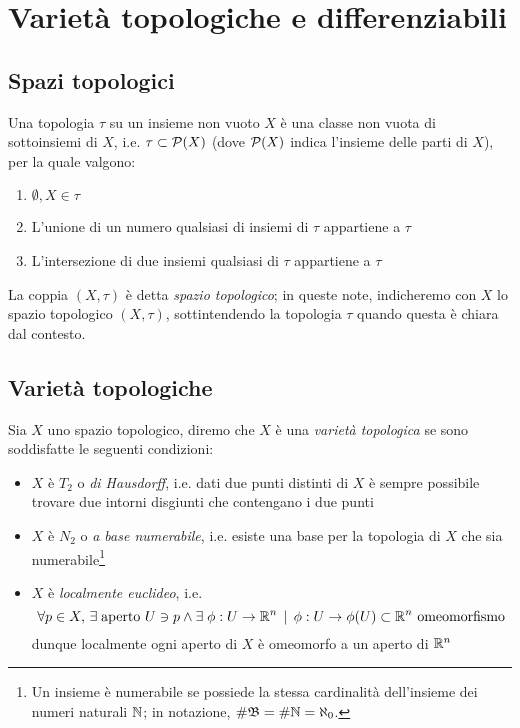 \section{Varietà topologiche e differenziabili}

\subsection{Spazi topologici}

Una topologia $ \tau $ su un insieme non vuoto $ X $ è una classe non vuota di sottoinsiemi di $ X $, i.e. $ \tau \subset \mathcal{P} (X) $ (dove $ \mathcal{P} (X) $ indica l'insieme delle parti di $ X $), per la quale valgono:

\begin{enumerate}
	\item $ \emptyset, X \in \tau $
	
	\item L'unione di un numero qualsiasi di insiemi di $ \tau $ appartiene a $ \tau $
	
	\item L'intersezione di due insiemi qualsiasi di $ \tau $ appartiene a $ \tau $
\end{enumerate}

La coppia $ (X, \tau) $ è detta \textit{spazio topologico}; in queste note, indicheremo con $ X $ lo spazio topologico $ (X, \tau) $, sottintendendo la topologia $ \tau $ quando questa è chiara dal contesto.

\subsection{Varietà topologiche}

Sia $ X $ uno spazio topologico, diremo che $ X $ è una \textit{varietà topologica} se sono soddisfatte le seguenti condizioni:

\begin{itemize}
	\item $ X $ è $ T_{2} $ o \textit{di Hausdorff}, i.e. dati due punti distinti di $ X $ è sempre possibile trovare due intorni disgiunti che contengano i due punti
	
	\item $ X $ è $ N_{2} $ o \textit{a base numerabile}, i.e. esiste una base per la topologia di $ X $ che sia numerabile\footnote{%
		Un insieme è numerabile se possiede la stessa cardinalità dell'insieme dei numeri naturali $ \mathbb{N} $; in notazione, $ \# \mathfrak{B} = \# \mathbb{N} = \aleph_{0} $.}
	
	\item $ X $ è \textit{localmente euclideo}, i.e. 
		\begin{equation}
			\forall p \in X, \, \exists \; \text{aperto } U \ni p \wedge \exists \; \phi : U \to \mathbb{R}^{n} \, \mid \, \phi : U \to \phi(U) \subset \mathbb{R}^{n} \text{ omeomorfismo}
		\end{equation}
		dunque localmente ogni aperto di $ X $ è omeomorfo a un aperto di $ \mathbb{R}^{n} $
\end{itemize}

